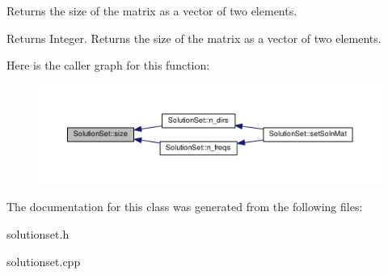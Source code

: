 Returns the size of the matrix as a vector of two elements. 

\begin{DoxyReturn}{Returns}
Integer. Returns the size of the matrix as a vector of two elements. 
\end{DoxyReturn}


Here is the caller graph for this function\-:\nopagebreak
\begin{figure}[H]
\begin{center}
\leavevmode
\includegraphics[width=350pt]{class_solution_set_a2484020f280cce582ae20f7631963adb_icgraph}
\end{center}
\end{figure}




The documentation for this class was generated from the following files\-:\begin{DoxyCompactItemize}
\item 
solutionset.\-h\item 
solutionset.\-cpp\end{DoxyCompactItemize}
